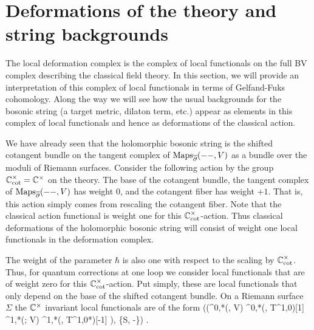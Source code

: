 \section{Deformations of the theory and string backgrounds}




The local deformation complex is the complex of local functionals on the full BV complex describing the classical field theory. 
In this section, we will provide an interpretation of this complex of local functionals in terms of Gelfand-Fuks cohomology. 
Along the way we will see how the usual backgrounds for the bosonic string (a target metric, dilaton term, etc.) appear as elements in this complex of local functionals and hence as deformations of the classical action. 

We have already seen that the holomorphic bosonic string is the shifted cotangent bundle on the tangent complex of ${\rm Maps}_{\overline{\partial}}(--, V)$ as a bundle over the moduli of Riemann surfaces. 
Consider the following action by the group $\mathbb C^\times_{\rm cot} = \mathbb C^\times$ on the theory.
The base of the cotangent bundle, the tangent complex of ${\rm Maps}_{\overline{\partial}}(--, V)$ has weight $0$, and the cotangent fiber has weight $+1$. 
That is, this action simply comes from rescaling the cotangent fiber.
Note that the classical action functional is weight one for this $\mathbb C^\times_{\rm cot}$-action. 
Thus classical deformations of the holomorphic bosonic string will consist of weight one local functionals in the deformation complex.

The weight of the parameter $\hbar$ is also one with respect to the scaling by $\mathbb C^\times_{\rm cot}$.
Thus, for quantum corrections at one loop we consider local functionals that are of weight zero for this $\mathbb C^\times_{\rm cot}$-action.
Put simply, these are local functionals that only depend on the base of the shifted cotangent bundle. 
On a Riemann surface $\Sigma$ the $\mathbb C^\times$ invariant local functionals are of the form
\ben
\left(\Oloc\left(\Omega^{0,*}(\Sigma, V) \oplus \Omega^{0,*}(\Sigma, T^{1,0})[1] \Omega^{1,*}(\Sigma ; V) \oplus \Omega^{1,*}(\Sigma, T^{1,0*})[-1] \right), \{S, -\}\right) .
\een

